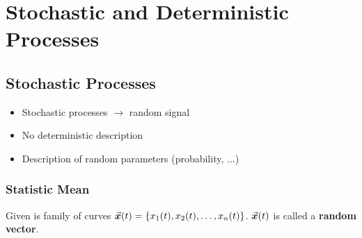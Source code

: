 %
%
%

\chapter{Stochastic and Deterministic Processes}

\begin{refsection}

\section{Stochastic Processes}

\begin{itemize}
	\item Stochastic processes $\rightarrow$ random signal
	\item No deterministic description
	\item Description of random parameters (probability, ...)
\end{itemize}

\subsection{Statistic Mean}

Given is family of curves $\vec{\bm{x}}(t) = \left\{x_1(t), x_2(t), \dots, x_n(t)\right\}$. $\vec{\bm{x}}(t)$ is called a  \textbf{random vector}.


\end{refsection}
